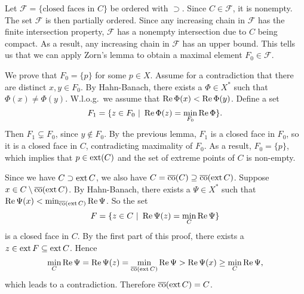 \begin{myproof}
  Let $\mathcal{F} = \{\textrm{closed faces in $C$}\}$ be ordered with $\supset$.
  Since $C \in \mathcal{F}$, it is nonempty. The set $\mathcal{F}$ is then partially ordered. Since any 
  increasing chain in $\mathcal{F}$ has the finite intersection property, $\mathcal{F}$ has a nonempty intersection due to $C$ being compact.
  As a result, any increasing chain in $\mathcal{F}$ has an upper bound.
  This tells us that we can apply Zorn's lemma to obtain a maximal element $F_0 \in \mathcal{F}$.
  
  \vspace*{0.5\baselineskip}
  We prove that $F_0 = \{p\}$ for some $p \in X$. Assume for a contradiction that there are distinct $x, y \in F_0$.
  By Hahn-Banach, there exists a $\Phi \in X^*$ such that $\Phi(x) \neq \Phi(y)$.
  W.l.o.g.~we assume that $\operatorname{Re} \Phi(x) < \operatorname{Re} \Phi(y)$. Define a set 
  $$F_1 = \{z \in F_0\ |\ \operatorname{Re} \Phi(z) = \min_{F_0} \operatorname{Re} \Phi\}.$$
  Then $F_1 \subsetneq F_0$, since $y \notin F_0$. By the previous lemma,
  $F_1$ is a closed face in $F_0$, so it is a closed face in $C$, contradicting maximality of $F_0$.
  As a result, $F_0 = \{p\}$, which implies that $p \in \operatorname{ext} (C)$ and the set of extreme points of $C$ is non-empty.
  
  \vspace*{0.5\baselineskip}
  Since we have $C \supset \operatorname{ext} C$, we also have $C = \overline{\operatorname{co}} (C) \supseteq \overline{\operatorname{co}} (\operatorname{ext} C)$.
  Suppose $x \in C \setminus \overline{\operatorname{co}} (\operatorname{ext} C)$. By Hahn-Banach, there exists a $\Psi \in X^*$
  such that $\operatorname{Re} \Psi(x) < \min _{\overline{\operatorname{co}} (\operatorname{ext} C)} \operatorname{Re} \Psi$.
  So the set 
  $$F = \{z \in C\ |\ \operatorname{Re} \Psi (z) = \min_C \operatorname{Re} \Psi\}$$
  is a closed face in $C$. By the first part of this proof,
  there exists a $z \in \operatorname{ext} F \subseteq \operatorname{ext} C$. Hence 
  $$\min_C \operatorname{Re} \Psi = \operatorname{Re} \Psi (z) = \min_{\overline{\operatorname{co}} (\operatorname{ext} C)} \operatorname{Re} \Psi > \operatorname{Re} \Psi(x) \geq \min_C \operatorname{Re} \Psi,$$
  which leads to a contradiction. Therefore $\overline{\operatorname{co}} (\operatorname{ext} C) = C$.
\end{myproof}

